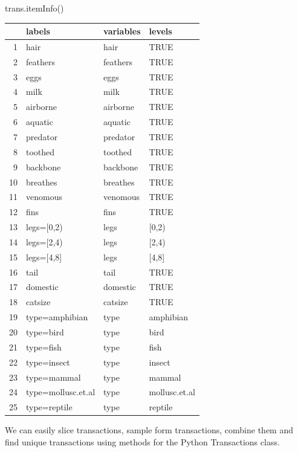\documentclass{article}
\newenvironment{Shaded}{\begin{snugshade}}{\end{snugshade}}
\newcommand{\NormalTok}[1]{#1}
\begin{document}
\begin{Shaded}
\begin{Highlighting}[]
\NormalTok{trans.itemInfo()}
\end{Highlighting}
\end{Shaded}

\begin{longtable}[]{@{}rlll@{}}
\toprule()
& labels & variables & levels \\
\midrule()
\endhead
1 & hair & hair & TRUE \\
2 & feathers & feathers & TRUE \\
3 & eggs & eggs & TRUE \\
4 & milk & milk & TRUE \\
5 & airborne & airborne & TRUE \\
6 & aquatic & aquatic & TRUE \\
7 & predator & predator & TRUE \\
8 & toothed & toothed & TRUE \\
9 & backbone & backbone & TRUE \\
10 & breathes & breathes & TRUE \\
11 & venomous & venomous & TRUE \\
12 & fins & fins & TRUE \\
13 & legs={[}0,2) & legs & {[}0,2) \\
14 & legs={[}2,4) & legs & {[}2,4) \\
15 & legs={[}4,8{]} & legs & {[}4,8{]} \\
16 & tail & tail & TRUE \\
17 & domestic & domestic & TRUE \\
18 & catsize & catsize & TRUE \\
19 & type=amphibian & type & amphibian \\
20 & type=bird & type & bird \\
21 & type=fish & type & fish \\
22 & type=insect & type & insect \\
23 & type=mammal & type & mammal \\
24 & type=mollusc.et.al & type & mollusc.et.al \\
25 & type=reptile & type & reptile \\
\bottomrule()
\end{longtable}

We can easily slice transactions, sample form transactions, combine them
and find unique transactions using methods for the Python Transactions
class.
\end{document}
